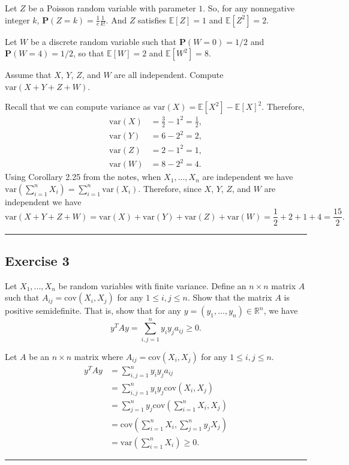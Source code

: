 \documentclass{article}
\theoremstyle{break}
\newenvironment{solution}{{\bf Solution:}}{\hfill\rule{2mm}{2mm}}
\newcommand{\E}{\mathbb{E}}
\newcommand{\var}{\mathrm{var}}
\newcommand{\cov}{\mathrm{cov}}
\newcommand{\R}{\mathbb{R}}
\renewcommand{\P}{\mathbf{P}}
\begin{document}
Let $Z$ be a Poisson random variable with parameter $1$. So, for any nonnegative integer $k$, $\P(Z = k) = \frac{1}{e} \frac{1}{k!}$. And $Z$ satisfies $\E[Z] = 1$ and $\E[Z^2] = 2$.

Let $W$ be a discrete random variable such that $\P(W = 0) = 1/2$ and $\P(W = 4) = 1/2$, so that $\E[W] = 2$ and $\E[W^2] = 8$.

Assume that $X$, $Y$, $Z$, and $W$ are all independent. Compute $\var(X + Y + Z + W)$.

\begin{solution}
Recall that we can compute variance as $\var(X) = \E[X^2] - \E[X]^2$. Therefore,
\begin{align*}
\var(X) &= \frac{3}{2} - 1^2 = \frac{1}{2}, \\
\var(Y) &= 6 - 2^2 = 2, \\
\var(Z) &= 2 - 1^2 = 1, \\
\var(W) &= 8 - 2^2 = 4.
\end{align*}
Using Corollary 2.25 from the notes, when $X_1, ... , X_n$ are independent we have 
$ \var \left(\sum_{i = 1}^n X_i \right) = \sum_{i = 1}^n \var(X_i).$
Therefore, since $X$, $Y$, $Z$, and $W$ are independent we have
\[\var(X + Y + Z + W) = \var(X) + \var(Y) + \var(Z) + \var(W) = \frac{1}{2} + 2 + 1 + 4 = \frac{15}{2}. \]
\end{solution}


\subsection*{Exercise 3}
Let $X_1, ..., X_n$ be random variables with finite variance. Define an $n \times n$ matrix $A$ such that $A_{ij} = \cov(X_i, X_j)$ for any $1 \leq i, j \leq n$. Show that the matrix $A$ is positive semidefinite. That is, show that for any $y = (y_1, ..., y_n) \in \R^n$, we have 
\[ y^TAy = \sum_{i,j = 1}^n y_i y_j a_{ij} \geq 0.
\]

\begin{solution}
Let $A$ be an $n \times n$ matrix where $A_{ij} = \cov(X_i, X_j)$ for any $1 \leq i , j  \leq n$.
\begin{align*}
y^T Ay &= \sum_{i,j = 1}^n y_i y_j a_{ij} \\
	&= \sum_{i,j = 1}^n y_i y_j  \cov(X_i, X_j) \\
	&= \sum_{j = 1}^n y_j \cov\left( \sum_{i = 1}^n X_i, X_j \right) \\
	&= \cov \left( \sum_{i = 1}^n X_i, \sum_{j = 1}^n y_j X_j \right) \\
	&= \var \left( \sum_{i = 1}^n X_i \right) \geq 0.
\end{align*}
\end{solution}
\end{document}
